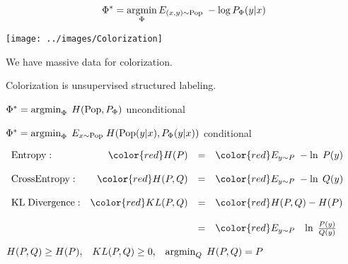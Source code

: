 {{

$$\Phi^* = \operatorname*{argmin}_\Phi E_{(x,y) \sim \mathrm{Pop}}\;-\log P_\Phi(y|x)$$

\vfill
\centerline{\texttt{[image: ../images/Colorization]}}

\vfill
We have massive data for colorization.

\vfill
Colorization is unsupervised structured labeling.
}


{\color{red} $\Phi^* = \operatorname*{argmin}_\Phi\;H(\mathrm{Pop},P_\Phi)$} unconditional

\vfill
{\color{red} $\Phi^* = \operatorname*{argmin}_\Phi\;E_{x \sim \mathrm{Pop}}\;H(\mathrm{Pop}(y|x),P_\Phi(y|x))$} conditional

\vfill
\centerline{
  $\begin{array}{lrcl}
\mathrm{Entropy}: & {\color{red} H(P)} & = & {\color{red} E_{y \sim P}\;-\ln\;P(y)} \\
\\
\mathrm{Cross Entropy:} & {\color{red} H(P,Q)} & = & {\color{red} E_{y \sim P}\;-\ln\;Q(y)} \\
\\
\mathrm{KL\; Divergence:} & {\color{red} KL(P,Q)} & = & {\color{red} H(P,Q) - H(P)} \\
\\
& & = & {\color{red} E_{y \sim P}\;\;\; \ln\;\frac{P(y)}{Q(y)}}
\end{array}$}

\vfill
\centerline{{\color{red} $H(P,Q) \geq H(P),\;\;\;KL(P,Q) \geq 0,\;\;\;\operatorname*{argmin}_Q\;H(P,Q) = P$}}



}
